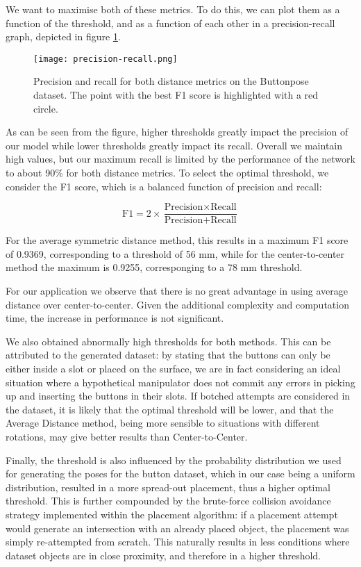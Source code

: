 We want to maximise both of these metrics. To do this, we can plot them as a function of the threshold, and as a function of each other in a precision-recall graph, depicted in figure \ref{fig:precisionrecall}.

\begin{figure}[ht]
    \texttt{[image: precision-recall.png]}
    \caption{Precision and recall for both distance metrics on the Buttonpose dataset. The point with the best F1 score is highlighted with a red circle.}
    \label{fig:precisionrecall}
\end{figure}

As can be seen from the figure, higher thresholds greatly impact the precision of our model while lower thresholds greatly impact its recall. Overall we maintain high values, but our maximum recall is limited by the performance of the network to about 90\% for both distance metrics. To select the optimal threshold, we consider the F1 score, which is a balanced function of precision and recall:

\begin{equation*}
    \text{F1} = 2\times\frac{\text{Precision}\times\text{Recall}}{\text{Precision}+\text{Recall}}
\end{equation*}

For the average symmetric distance method, this results in a maximum F1 score of 0.9369, corresponding to a threshold of 56 mm, while for the center-to-center method the maximum is 0.9255, corresponging to a 78 mm threshold.

For our application we observe that there is no great advantage in using average distance over center-to-center. Given the additional complexity and computation time, the increase in performance is not significant.

We also obtained abnormally high thresholds for both methods. This can be attributed to the generated dataset: by stating that the buttons can only be either inside a slot or placed on the surface, we are in fact considering an ideal situation where a hypothetical manipulator does not commit any errors in picking up and inserting the buttons in their slots. If botched attempts are considered in the dataset, it is likely that the optimal threshold will be lower, and that the Average Distance method, being more sensible to situations with different rotations, may give better results than Center-to-Center.

Finally, the threshold is also influenced by the probability distribution we used for generating the poses for the button dataset, which in our case being a uniform distribution, resulted in a more spread-out placement, thus a higher optimal threshold. This is further compounded by the brute-force collision avoidance strategy implemented within the placement algorithm: if a placement attempt would generate an intersection with an already placed object, the placement was simply re-attempted from scratch. This naturally results in less conditions where dataset objects are in close proximity, and therefore in a higher threshold.


